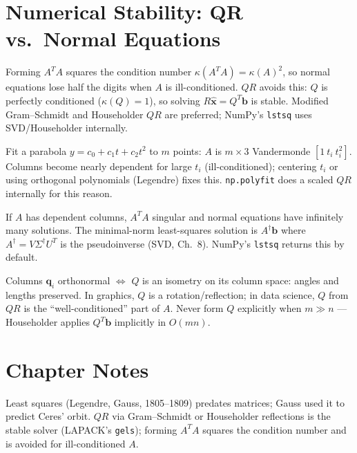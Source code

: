 \section{Numerical Stability: QR vs.\ Normal Equations}
\label{sec:stability}
Forming $A^TA$ squares the condition number $\kappa(A^TA)=\kappa(A)^2$, so normal equations lose half the digits when $A$ is ill-conditioned. $QR$ avoids this: $Q$ is perfectly conditioned ($\kappa(Q)=1$), so solving $R\hat{\mathbf{x}}=Q^T\mathbf{b}$ is stable. Modified Gram--Schmidt and Householder $QR$ are preferred; NumPy's \texttt{lstsq} uses SVD/Householder internally.



\begin{example}
Fit a parabola $y=c_0+c_1t+c_2t^2$ to $m$ points: $A$ is $m\times3$ Vandermonde $[1\ t_i\ t_i^2]$. Columns become nearly dependent for large $t_i$ (ill-conditioned); centering $t_i$ or using orthogonal polynomials (Legendre) fixes this. \texttt{np.polyfit} does a scaled $QR$ internally for this reason.
\end{example}

\begin{remark}
If $A$ has dependent columns, $A^TA$ singular and normal equations have infinitely many solutions. The minimal-norm least-squares solution is $A^\dagger\mathbf{b}$ where $A^\dagger=V\Sigma^\dagger U^T$ is the pseudoinverse (SVD, Ch.~8). NumPy's \texttt{lstsq} returns this by default.
\end{remark}



\begin{remark}[Geometric meaning of $Q^TQ=I$]
Columns $\mathbf{q}_i$ orthonormal $\iff$ $Q$ is an isometry on its column space: angles and lengths preserved. In graphics, $Q$ is a rotation/reflection; in data science, $Q$ from $QR$ is the ``well-conditioned'' part of $A$. Never form $Q$ explicitly when $m\gg n$ --- Householder applies $Q^T\mathbf{b}$ implicitly in $O(mn)$.
\end{remark}


\section{Chapter Notes}
Least squares (Legendre, Gauss, 1805--1809) predates matrices; Gauss used it to predict Ceres' orbit. $QR$ via Gram--Schmidt or Householder reflections is the stable solver (LAPACK's \texttt{gels}); forming $A^TA$ squares the condition number and is avoided for ill-conditioned $A$.

